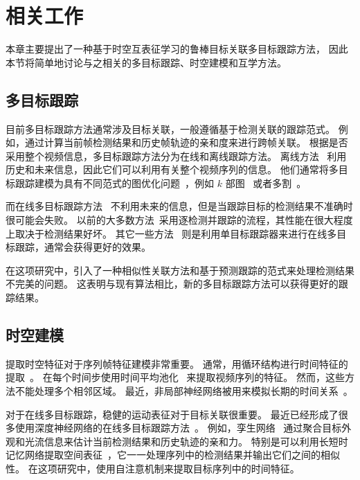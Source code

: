 \section{相关工作}
本章主要提出了一种基于时空互表征学习的鲁棒目标关联多目标跟踪方法，
因此本节将简单地讨论与之相关的多目标跟踪、时空建模和互学方法。

\subsection{多目标跟踪}
目前多目标跟踪方法通常涉及目标关联，一般遵循基于检测关联的跟踪范式。
例如，通过计算当前帧检测结果和历史帧轨迹的亲和度来进行跨帧关联。
根据是否采用整个视频信息，多目标跟踪方法分为在线和离线跟踪方法。
离线方法~\cite{tang2017multiple,RN973} 利用历史和未来信息，因此它们可以利用有关整个视频序列的信息。
他们通常将多目标跟踪建模为具有不同范式的图优化问题~\cite{li2020graph}，例如 $k$ 部图~\cite{dehghan2015gmmcp} 或者多割~\cite{tang2017multiple}。

而在线多目标跟踪方法~\cite{chu2017online, RN974, RN1004, junbo2020a} 不利用未来的信息，但是当跟踪目标的检测结果不准确时很可能会失败。
以前的大多数方法~\cite{bae2014robust,xu2019spatial-temporal}采用逐检测并跟踪的流程，其性能在很大程度上取决于检测结果好坏。
其它一些方法~\cite{RN1004,RN455,RN542} 则是利用单目标跟踪器来进行在线多目标跟踪，通常会获得更好的效果。

在这项研究中，引入了一种相似性关联方法和基于预测跟踪的范式来处理检测结果不完美的问题。
这表明与现有算法相比，新的多目标跟踪方法可以获得更好的跟踪结果。


\subsection{时空建模}
提取时空特征对于序列帧特征建模非常重要。
通常，用循环结构进行时间特征的提取~\cite{chung2017a, mclaughlin2016recurrent, RN977}。
在每个时间步使用时间平均池化~\cite{mclaughlin2016recurrent} 来提取视频序列的特征。
然而，这些方法不能处理多个相邻区域。
最近，非局部神经网络被用来模拟长期的时间关系~\cite{RN580}。
 
对于在线多目标跟踪，稳健的运动表征对于目标关联很重要。
最近已经形成了很多使用深度神经网络的在线多目标跟踪方法~\cite{chu2017online,RN455,RN601}。
例如，孪生网络~\cite{leal-taixe2016learning} 通过聚合目标外观和光流信息来估计当前检测结果和历史轨迹的亲和力。
特别是可以利用长短时记忆网络提取空间表征~\cite{RN455}，它一一处理序列中的检测结果并输出它们之间的相似性。
在这项研究中，使用自注意机制来提取目标序列中的时间特征。


